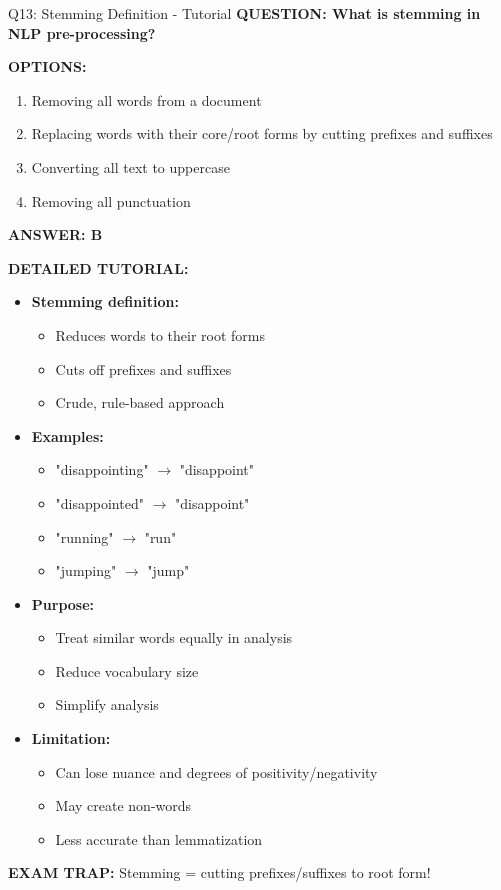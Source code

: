 \documentclass[8pt]{beamer}
\begin{document}
	\begin{frame}{Q13: Stemming Definition - Tutorial}
		\fontsize{6.5}{7.5}\selectfont
		\textbf{QUESTION: What is stemming in NLP pre-processing?}
		
		\vspace{0.1cm}
		\textbf{OPTIONS:}
		\begin{enumerate}
			\item Removing all words from a document
			\item Replacing words with their core/root forms by cutting prefixes and suffixes
			\item Converting all text to uppercase
			\item Removing all punctuation
		\end{enumerate}
		
		\vspace{0.1cm}
		\textcolor{myblue}{\textbf{ANSWER: B}}
		
		\vspace{0.1cm}
		\textbf{DETAILED TUTORIAL:}
		\begin{itemize}
			\item \textbf{Stemming definition:}
			\begin{itemize}
				\item Reduces words to their root forms
				\item Cuts off prefixes and suffixes
				\item Crude, rule-based approach
			\end{itemize}
			\item \textbf{Examples:}
			\begin{itemize}
				\item "disappointing" $\rightarrow$ "disappoint"
				\item "disappointed" $\rightarrow$ "disappoint"
				\item "running" $\rightarrow$ "run"
				\item "jumping" $\rightarrow$ "jump"
			\end{itemize}
			\item \textbf{Purpose:}
			\begin{itemize}
				\item Treat similar words equally in analysis
				\item Reduce vocabulary size
				\item Simplify analysis
			\end{itemize}
			\item \textbf{Limitation:}
			\begin{itemize}
				\item Can lose nuance and degrees of positivity/negativity
				\item May create non-words
				\item Less accurate than lemmatization
			\end{itemize}
		\end{itemize}
		
		\textcolor{myred}{\textbf{EXAM TRAP:}} Stemming = \textcolor{myblue}{cutting prefixes/suffixes to root form}!
	\end{frame}
	
\end{document}

